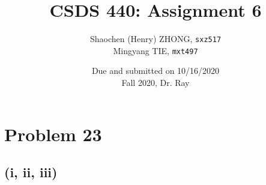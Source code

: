 \documentclass[12pt]{article}
\newcommand{\ilcode}{\texttt}
\begin{document}
\title{\textbf{CSDS 440: Assignment 6}}

\author{Shaochen (Henry) ZHONG, \ilcode{sxz517} \\ Mingyang TIE, \ilcode{mxt497}}
\date{Due and submitted on 10/16/2020 \\ Fall 2020, Dr. Ray}
\maketitle


\section{Problem 23}

\subsection{(i, ii, iii)}
\end{document}
